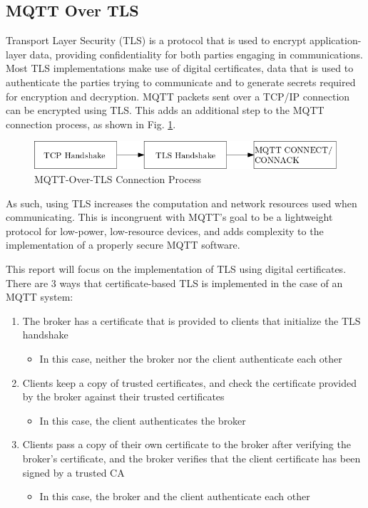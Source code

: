 \documentclass[12pt]{article}
\begin{document}
\subsection{MQTT Over TLS}
Transport Layer Security (TLS) is a protocol that is used to encrypt application-layer data, providing confidentiality for both parties engaging in communications. Most TLS implementations make use of digital certificates, data that is used to authenticate the parties trying to communicate and to generate secrets required for encryption and decryption. MQTT packets sent over a TCP/IP connection can be encrypted using TLS. This adds an additional step to the MQTT connection process, as shown in Fig. \ref{fig:connection}.\par
\begin{figure}[!htbp]
\centering
	\includegraphics[scale=0.5]{tcp-tls-mqtt.png}
	\caption{MQTT-Over-TLS Connection Process\label{fig:connection}}
\end{figure}
As such, using TLS increases the computation and network resources used when communicating. This is incongruent with MQTT's goal to be a lightweight protocol for low-power, low-resource devices, and adds complexity to the implementation of a properly secure MQTT software.\par
This report will focus on the implementation of TLS using digital certificates. There are 3 ways that certificate-based TLS is implemented in the case of an MQTT system:
\begin{enumerate}
	\item The broker has a certificate that is provided to clients that initialize the TLS handshake
	\begin{itemize}
		\item In this case, neither the broker nor the client authenticate each other
	\end{itemize}
	\item Clients keep a copy of trusted certificates, and check the certificate provided by the broker against their trusted certificates
	\begin{itemize}
		\item In this case, the client authenticates the broker
	\end{itemize}
	\item Clients pass a copy of their own certificate to the broker after verifying the broker's certificate, and the broker verifies that the client certificate has been signed by a trusted CA
	\begin{itemize}
		\item In this case, the broker and the client authenticate each other
	\end{itemize}
\end{enumerate}
\end{document}
